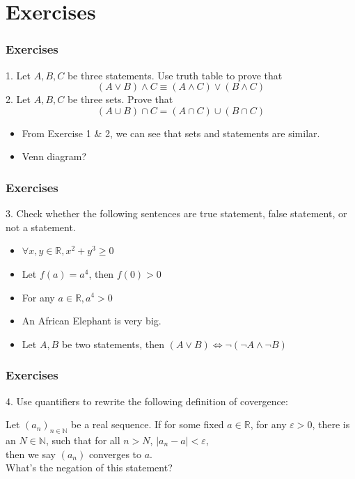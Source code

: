 \documentclass{beamer}
\begin{document}
\section{Exercises}
\begin{frame}
    \frametitle{Exercises}
    1. Let $A, B, C$ be three statements. Use truth table to prove that 
    \begin{equation*}
        (A\vee B)\wedge C \equiv (A\wedge C)\vee (B\wedge C)
    \end{equation*}
    2. Let $A, B, C$ be three sets. Prove that
    \begin{equation*}
        (A\cup B)\cap C =(A\cap C)\cup (B\cap C)
    \end{equation*}
    \begin{itemize}
        \item From Exercise 1 \& 2, we can see that sets and statements are similar.
        \item Venn diagram?
    \end{itemize}
\end{frame}
\begin{frame}
\frametitle{Exercises}
3. Check whether the following sentences are true statement, false statement, or not a statement.
\begin{itemize}
    \item $\forall x, y\in \mathbb{R}, x^2+y^3\geq 0$
    \item Let  $f(a)=a^4$, then $f(0)>0$
    \item For any $a\in \mathbb{R}, a^4>0$
    \item An African Elephant is very big.
    \item Let $A, B$ be two statements, then $(A\vee B)\Leftrightarrow\neg(\neg A\wedge\neg B)$
\end{itemize}
\end{frame}
\begin{frame}
    \frametitle{Exercises}
4. Use quantifiers to rewrite the following definition of covergence:
\par \vspace{2em} \hspace{1em} Let $(a_n)_{n\in \mathbb{N}}$ be a real sequence. If for some fixed $a \in \mathbb{R}$, 
for any $\varepsilon>0$, there is an $N\in \mathbb{N}$, such that for all $n>N$, $|a_n-a|<\varepsilon$,\\ then we
say $(a_n)$ converges to $a$.\\
\vspace{2em}
What's the negation of this statement?
\end{frame}
\end{document}
